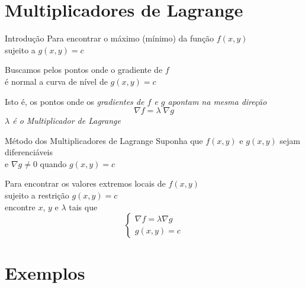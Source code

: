 \documentclass[fleqn,utf8,aspectratio=169,12pt]{beamer}
\begin{document}
\section{Multiplicadores de Lagrange}

\begin{frame}{Introdução}
  Para encontrar o máximo (mínimo) da função \(f(x, y)\)
  \\[2mm]
  sujeito a \(g(x, y) = c\)

  \pause
  \bigskip
  Buscamos pelos pontos onde o gradiente de $f$
  \\
  é normal a curva de nível de \(g(x, y) = c\)

  \pause
  \bigskip
  Isto é, os pontos onde os
  \emph{gradientes de $f$ e $g$ apontam na mesma direção}
  \pause
  \[
    \nabla f = \lambda\;\nabla g
  \]
  \pause
  \emph{\(\lambda\) é o Multiplicador de Lagrange}
\end{frame}


\begin{frame}{Método dos Multiplicadores de Lagrange}
  Suponha que \(f(x, y)\) e \(g(x, y)\) sejam diferenciáveis\\[2mm]
  e \(\nabla g\neq 0\) quando \(g(x, y) = c\)

  \pause
  \vspace{\baselineskip}
  Para encontrar os valores extremos locais de \(f(x, y)\) \\[2mm]
  \pause
  sujeito a restrição \(g(x, y) = c\) \\[2mm]
  \pause
  encontre $x$, $y$ e $\lambda$ tais que
  \[
    \begin{cases}
      \nabla f = \lambda \nabla g   \\
      g(x, y) = c
    \end{cases}
  \]
\end{frame}

\section{Exemplos}



\end{document}
